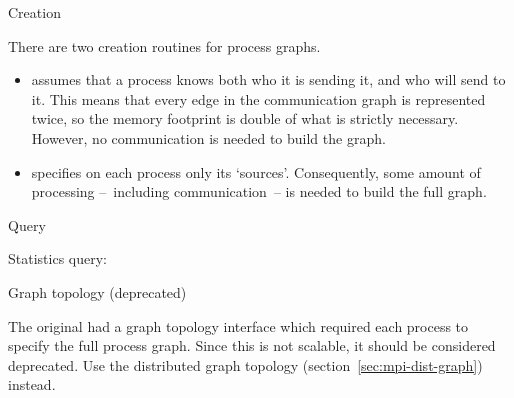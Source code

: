  {Creation}

There are two creation routines for process graphs.
\begin{itemize}
\item {} assumes that a
  process knows both who it is sending it, and who will send to
  it. This means that every edge in the communication graph is
  represented twice, so the memory footprint is double of what is
  strictly necessary. However, no communication is needed to build the
  graph.
\item {} specifies on each process
  only its `sources'. Consequently, some amount of processing
  --~including communication~-- is needed to build the full graph.
\end{itemize}


 {Query}

Statistics query:
%

 {Graph topology (deprecated)}
\label{sec:mpi-1-graph}

The original  had a graph topology interface
which required each process to specify the full process graph. Since
this is not scalable, it should be considered deprecated. Use the
distributed graph topology (section~\ref{sec:mpi-dist-graph}) instead.


